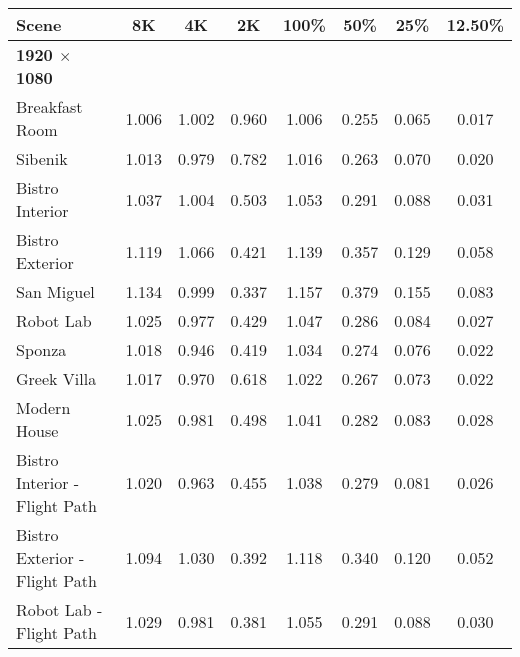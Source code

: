 \begin{table*}
\scriptsize
\setlength{\tabcolsep}{3pt}
\centering
\begin{tabular}{l ccc|cccc}
\textbf{Scene}                & \textbf{8K}    & \textbf{4K}    & \textbf{2K}    & \textbf{100\%} & \textbf{50\%}  & \textbf{25\%}  & \textbf{12.50\%} \\
\hline
\textbf{1920 $\times$ 1080}   & & & & & & & \\
Breakfast Room                & 1.006          & 1.002          & 0.960          & 1.006          & 0.255          & 0.065          & 0.017            \\
Sibenik                       & 1.013          & 0.979          & 0.782          & 1.016          & 0.263          & 0.070          & 0.020            \\
Bistro Interior               & 1.037          & 1.004          & 0.503          & 1.053          & 0.291          & 0.088          & 0.031            \\
Bistro Exterior               & 1.119          & 1.066          & 0.421          & 1.139          & 0.357          & 0.129          & 0.058            \\
San Miguel                    & 1.134          & 0.999          & 0.337          & 1.157          & 0.379          & 0.155          & 0.083            \\
Robot Lab                     & 1.025          & 0.977          & 0.429          & 1.047          & 0.286          & 0.084          & 0.027            \\
Sponza                        & 1.018          & 0.946          & 0.419          & 1.034          & 0.274          & 0.076          & 0.022            \\
Greek Villa                   & 1.017          & 0.970          & 0.618          & 1.022          & 0.267          & 0.073          & 0.022            \\
Modern House                  & 1.025          & 0.981          & 0.498          & 1.041          & 0.282          & 0.083          & 0.028            \\
Bistro Interior - Flight Path & 1.020          & 0.963          & 0.455          & 1.038          & 0.279          & 0.081          & 0.026            \\
Bistro Exterior - Flight Path & 1.094          & 1.030          & 0.392          & 1.118          & 0.340          & 0.120          & 0.052            \\
Robot Lab - Flight Path       & 1.029          & 0.981          & 0.381          & 1.055          & 0.291          & 0.088          & 0.030            \\

\end{tabular}
\end{table*}
